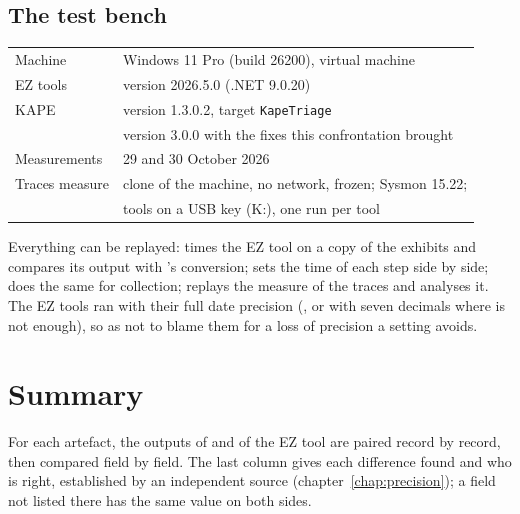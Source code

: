 \documentclass[11pt,a4paper,oneside]{report}
\begin{document}
\section{The test bench}

\begin{tabular}{@{}ll@{}}
Machine & Windows 11 Pro (build 26200), virtual machine \\
EZ tools & version 2026.5.0 (.NET 9.0.20) \\
KAPE & version 1.3.0.2, target \texttt{KapeTriage} \\
\wac{} & version 3.0.0 with the fixes this confrontation brought \\
Measurements & 29 and 30 October 2026 \\
Traces measure & clone of the machine, no network, frozen; Sysmon 15.22; \\
               & tools on a USB key (K:), one run per tool \\
\end{tabular}

Everything can be replayed:  times
the EZ tool on a copy of the exhibits and compares its output with \wac{}'s
conversion;  sets the time of each step side
by side;
 does the same for collection;
 replays the measure of the traces
and  analyses it. The EZ tools ran
with their full date precision (, or  with seven decimals where
 is not enough), so as not to blame them for a loss of precision a
setting avoids.

\chapter{Summary}

For each artefact, the outputs of \wac{} and of the EZ tool are paired record by
record, then compared field by field. The last column gives each difference
found and who is right, established by an independent source
(chapter~\ref{chap:precision}); a field not listed there has the same value on
both sides.
\end{document}
